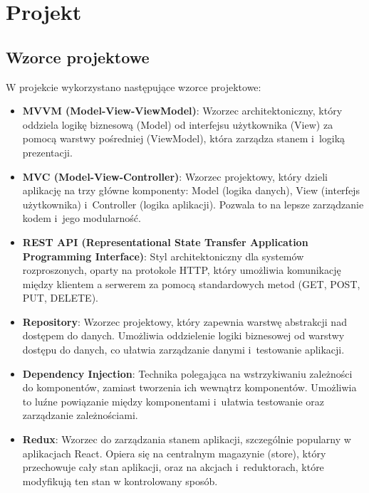 
\chapter{Projekt}
\label{ch:projekt}

\section{Wzorce projektowe}\label{sec:wzorce-projektowe}
W projekcie wykorzystano następujące wzorce projektowe:
\begin{itemize}

    \item \textbf{MVVM (Model-View-ViewModel)}: Wzorzec architektoniczny, który oddziela logikę biznesową (Model) od interfejsu użytkownika (View) za pomocą warstwy pośredniej (ViewModel), która zarządza stanem i~logiką prezentacji.

    \item \textbf{MVC (Model-View-Controller)}: Wzorzec projektowy, który dzieli aplikację na trzy główne komponenty: Model (logika danych), View (interfejs użytkownika) i~Controller (logika aplikacji).
    Pozwala to na lepsze zarządzanie kodem i~jego modularność.

    \item \textbf{REST API (Representational State Transfer Application Programming Interface)}: Styl architektoniczny dla systemów rozproszonych, oparty na protokole HTTP, który umożliwia komunikację między klientem a serwerem za pomocą standardowych metod (GET, POST, PUT, DELETE).

    \item \textbf{Repository}: Wzorzec projektowy, który zapewnia warstwę abstrakcji nad dostępem do danych.
    Umożliwia oddzielenie logiki biznesowej od warstwy dostępu do danych, co ułatwia zarządzanie danymi i~testowanie aplikacji.

    \item \textbf{Dependency Injection}: Technika polegająca na wstrzykiwaniu zależności do komponentów, zamiast tworzenia ich wewnątrz komponentów.
    Umożliwia to luźne powiązanie między komponentami i~ułatwia testowanie oraz zarządzanie zależnościami.

    \item \textbf{Redux}: Wzorzec do zarządzania stanem aplikacji, szczególnie popularny w aplikacjach React.
    Opiera się na centralnym magazynie (store), który przechowuje cały stan aplikacji, oraz na akcjach i~reduktorach, które modyfikują ten stan w kontrolowany sposób.


\end{itemize}
